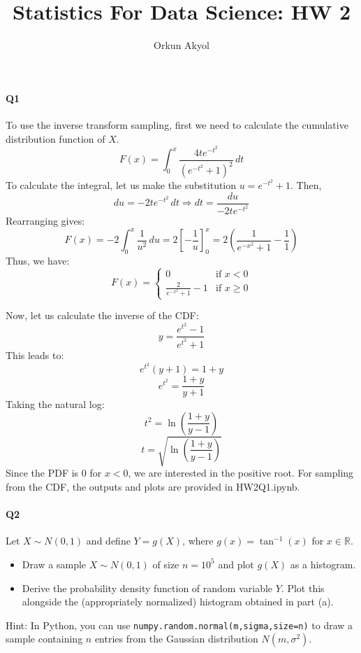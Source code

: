 \documentclass[10pt,letterpaper]{article}
\author{Orkun Akyol}
\title{Statistics For Data Science: HW 2}
\begin{document}
\paragraph{Q1}
To use the inverse transform sampling, first we need to calculate the cumulative distribution function of \( X \). 
\[
F(x) = \int_{0}^{x} \frac{4te^{-t^2}}{(e^{-t^2}+1)^2} \,dt
\]    
To calculate the integral, let us make the substitution \( u = e^{-t^2}+1 \). Then,
\[
du = -2te^{-t^2} \,dt \Rightarrow dt = \frac{du}{-2te^{-t^2}}
\]
Rearranging gives:
\[
F(x) = -2 \int_{0}^{x} \frac{1}{u^2} \, du = 2\left[-\frac{1}{u}\right]_{0}^{x} = 2\left(\frac{1}{e^{-x^2}+1} - \frac{1}{1}\right) 
\]
Thus, we have:
\[
F(x) = \begin{cases}
0 & \text{if } x < 0\\
\frac{2}{e^{-x^2}+1}-1 & \text{if } x \ge 0
\end{cases}
\]

Now, let us calculate the inverse of the CDF:
\[
y = \frac{e^{t^2}-1}{e^{t^2}+1}
\]
This leads to:
\[
e^{t^2}(y + 1) = 1 + y
\]
\[
e^{t^2} = \frac{1 + y}{y + 1}
\]
Taking the natural log:
\[
t^2 = \ln\left(\frac{1+y}{y-1}\right)
\]
\[
t = \sqrt{\ln\left(\frac{1+y}{y-1}\right)}
\]
Since the PDF is \( 0 \) for \( x<0 \), we are interested in the positive root. For sampling from the CDF, the outputs and plots are provided in HW2Q1.ipynb.

\paragraph{Q2}
Let \( X \sim N(0, 1) \) and define \( Y = g(X) \), where \( g(x) = \tan^{-1}(x) \) for \( x \in \mathbb{R} \).
\begin{itemize}
    \item Draw a sample \( X \sim N(0, 1) \) of size \( n = 10^5 \) and plot \( g(X) \) as a histogram.
    \item Derive the probability density function of random variable \( Y \). Plot this alongside the (appropriately normalized) histogram obtained in part (a).
\end{itemize}
Hint: In Python, you can use \texttt{numpy.random.normal(m,sigma,size=n)} to draw a sample containing \( n \) entries from the Gaussian distribution \( N(m, \sigma^2) \).
\end{document}
